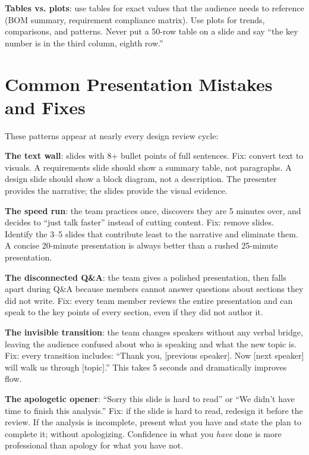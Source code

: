 \textbf{Tables vs. plots}: use tables for exact values that the audience needs to reference (BOM summary, requirement compliance matrix). Use plots for trends, comparisons, and patterns. Never put a 50-row table on a slide and say ``the key number is in the third column, eighth row.''



\section{Common Presentation Mistakes and Fixes}
These patterns appear at nearly every design review cycle:

\textbf{The text wall}: slides with 8+ bullet points of full sentences. Fix: convert text to visuals. A requirements slide should show a summary table, not paragraphs. A design slide should show a block diagram, not a description. The presenter provides the narrative; the slides provide the visual evidence.

\textbf{The speed run}: the team practices once, discovers they are 5 minutes over, and decides to ``just talk faster'' instead of cutting content. Fix: remove slides. Identify the 3--5 slides that contribute least to the narrative and eliminate them. A concise 20-minute presentation is always better than a rushed 25-minute presentation.

\textbf{The disconnected Q\&A}: the team gives a polished presentation, then falls apart during Q\&A because members cannot answer questions about sections they did not write. Fix: every team member reviews the entire presentation and can speak to the key points of every section, even if they did not author it.

\textbf{The invisible transition}: the team changes speakers without any verbal bridge, leaving the audience confused about who is speaking and what the new topic is. Fix: every transition includes: ``Thank you, [previous speaker]. Now [next speaker] will walk us through [topic].'' This takes 5 seconds and dramatically improves flow.

\textbf{The apologetic opener}: ``Sorry this slide is hard to read'' or ``We didn't have time to finish this analysis.'' Fix: if the slide is hard to read, redesign it before the review. If the analysis is incomplete, present what you have and state the plan to complete it; without apologizing. Confidence in what you \emph{have} done is more professional than apology for what you have not.


